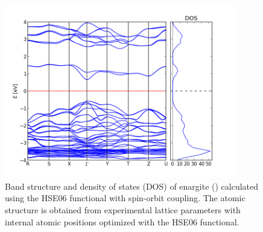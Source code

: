 \begin{figure}[h!]
  \centering
    \includegraphics[width=0.9\textwidth]{figures/enargite_band_structure.png}
    \caption{Band structure and density of states (DOS) of enargite ({\enargite}) calculated using the HSE06 functional with spin-orbit coupling. The atomic structure is obtained from experimental lattice parameters with internal atomic positions optimized with the HSE06 functional.}
  \label{enargite_band_structure}
\end{figure}

